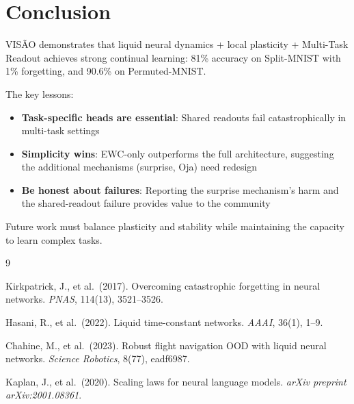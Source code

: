 \documentclass[11pt,a4paper]{article}
\begin{document}
\section{Conclusion}

VISÃO demonstrates that liquid neural dynamics + local plasticity + Multi-Task Readout achieves strong continual learning: 81\% accuracy on Split-MNIST with 1\% forgetting, and 90.6\% on Permuted-MNIST.

The key lessons:
\begin{itemize}
    \item \textbf{Task-specific heads are essential}: Shared readouts fail catastrophically in multi-task settings
    \item \textbf{Simplicity wins}: EWC-only outperforms the full architecture, suggesting the additional mechanisms (surprise, Oja) need redesign
    \item \textbf{Be honest about failures}: Reporting the surprise mechanism's harm and the shared-readout failure provides value to the community
\end{itemize}

Future work must balance plasticity and stability while maintaining the capacity to learn complex tasks.


\begin{thebibliography}{9}

Kirkpatrick, J., et al.\ (2017).
Overcoming catastrophic forgetting in neural networks.
\textit{PNAS}, 114(13), 3521--3526.

Hasani, R., et al.\ (2022).
Liquid time-constant networks.
\textit{AAAI}, 36(1), 1--9.

Chahine, M., et al.\ (2023).
Robust flight navigation OOD with liquid neural networks.
\textit{Science Robotics}, 8(77), eadf6987.

Kaplan, J., et al.\ (2020).
Scaling laws for neural language models.
\textit{arXiv preprint arXiv:2001.08361}.

\end{thebibliography}
\end{document}
